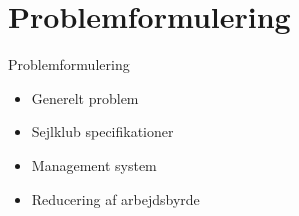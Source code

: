 \section{Problemformulering}

\begin{frame}{Problemformulering}
  
  \begin{itemize}
    \item Generelt problem
    
    \item Sejlklub specifikationer
    
    \item Management system
    
    \item Reducering af arbejdsbyrde
    
  \end{itemize}
\end{frame}
